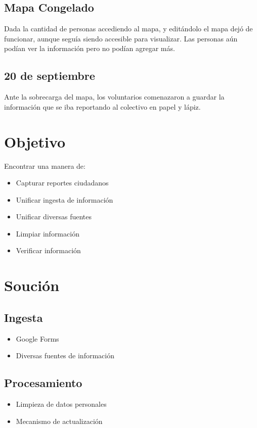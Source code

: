 \documentclass[11pt]{article}
\begin{document}
\subsection{Mapa Congelado}
\label{sec:org5c4e658}
Dada la cantidad de personas accediendo al mapa, y editándolo el mapa dejó de funcionar, aunque seguía siendo accesible para visualizar. Las personas aún podían ver la información pero no podían agregar más.

\subsection{20 de septiembre}
\label{sec:org31d30f6}

Ante la sobrecarga del mapa, los voluntarios comenazaron a guardar la información que se iba reportando al colectivo en papel y lápiz.
\section{Objetivo}
\label{sec:org449f233}

Encontrar una manera de:
\begin{itemize}
\item Capturar reportes ciudadanos
\item Unificar ingesta de información
\item Unificar diversas fuentes
\item Limpiar información
\item Verificar información
\end{itemize}

\section{Soución}
\label{sec:org592a213}
\subsection{Ingesta}
\label{sec:org4421080}
\begin{itemize}
\item Google Forms
\item Diversas fuentes de información
\end{itemize}
\subsection{Procesamiento}
\label{sec:org176dfe8}
\begin{itemize}
\item Limpieza de datos personales
\item Mecanismo de actualización
\end{itemize}
\end{document}
